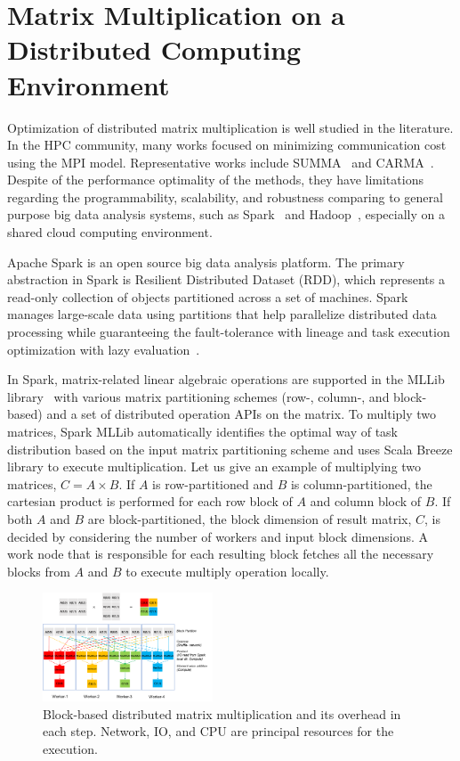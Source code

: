 \documentclass[10pt, conference, compsocconf]{IEEEtran}
\begin{document}
\section{Matrix Multiplication on a Distributed Computing Environment}\label{sec:distributed-matrix-computation}
Optimization of distributed matrix multiplication is well studied in the literature. In the HPC community, many works focused on minimizing communication cost using the MPI model. Representative works include SUMMA~\cite{summa} and CARMA~\cite{carma}. Despite of the performance optimality of the methods, they have limitations regarding the programmability, scalability, and robustness comparing to general purpose big data analysis systems, such as Spark~\cite{spark} and Hadoop~\cite{hadoop}, especially on a shared cloud computing environment.

Apache Spark is an open source big data analysis platform. The primary abstraction in Spark is Resilient Distributed Dataset (RDD), which represents a read-only collection of objects partitioned across a set of machines. Spark manages large-scale data using partitions that help parallelize distributed data processing while guaranteeing the fault-tolerance with lineage and task execution optimization with lazy evaluation~\cite{spark}.

In Spark, matrix-related linear algebraic operations are supported in the MLLib library~\cite{spark-mm} with various matrix partitioning schemes (row-, column-, and block-based) and a set of distributed operation APIs on the matrix. To multiply two matrices, Spark MLLib automatically identifies the optimal way of task distribution based on the input matrix partitioning scheme and uses Scala Breeze library to execute multiplication. Let us give an example of multiplying two matrices, $C = A \times B$. If $A$ is row-partitioned and $B$ is column-partitioned, the cartesian product is performed for each row block of $A$ and column block of $B$. If both $A$ and $B$ are block-partitioned, the block dimension of result matrix, $C$, is decided by considering the number of workers and input block dimensions. A work node that is responsible for each resulting block fetches all the necessary blocks from $A$ and $B$ to execute multiply operation locally.

\begin{figure}
  \centering\includegraphics[width=0.45\textwidth]{figures/matmult-overhead-non-square.pdf}\caption{Block-based distributed matrix multiplication and its overhead in each step. Network, IO, and CPU are principal resources for the execution.}\label{fig:matmul-with-overhead}
\end{figure}
\end{document}
